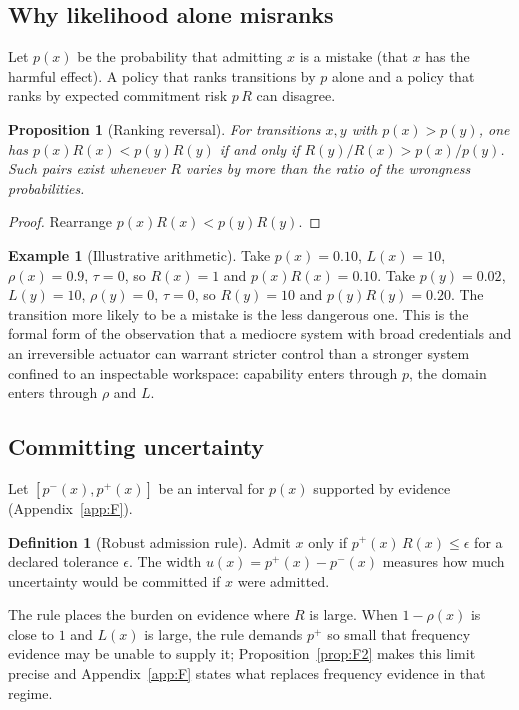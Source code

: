 \documentclass[11pt]{article}
\newtheorem{proposition}[theorem]{Proposition}
\theoremstyle{definition}
\newtheorem{definition}[theorem]{Definition}
\newtheorem{example}[theorem]{Example}
\begin{document}
\subsection{Why likelihood alone misranks}

Let $p(x)$ be the probability that admitting $x$ is a mistake (that $x$ has the harmful effect). A policy that ranks transitions by $p$ alone and a policy that ranks by expected commitment risk $p\,R$ can disagree.

\begin{proposition}[Ranking reversal]\label{prop:D3}
For transitions $x,y$ with $p(x)>p(y)$, one has $p(x)R(x)<p(y)R(y)$ if and only if $R(y)/R(x)>p(x)/p(y)$. Such pairs exist whenever $R$ varies by more than the ratio of the wrongness probabilities.
\end{proposition}
\begin{proof}
Rearrange $p(x)R(x)<p(y)R(y)$.
\end{proof}

\begin{example}[Illustrative arithmetic]
Take $p(x)=0.10$, $L(x)=10$, $\rho(x)=0.9$, $\tau=0$, so $R(x)=1$ and $p(x)R(x)=0.10$. Take $p(y)=0.02$, $L(y)=10$, $\rho(y)=0$, $\tau=0$, so $R(y)=10$ and $p(y)R(y)=0.20$. The transition more likely to be a mistake is the less dangerous one. This is the formal form of the observation that a mediocre system with broad credentials and an irreversible actuator can warrant stricter control than a stronger system confined to an inspectable workspace: capability enters through $p$, the domain enters through $\rho$ and $L$.
\end{example}

\subsection{Committing uncertainty}

Let $[p^-(x),p^+(x)]$ be an interval for $p(x)$ supported by evidence (Appendix~\ref{app:F}).

\begin{definition}[Robust admission rule]
Admit $x$ only if $p^+(x)\,R(x)\le\epsilon$ for a declared tolerance $\epsilon$. The width $u(x)=p^+(x)-p^-(x)$ measures how much uncertainty would be committed if $x$ were admitted.
\end{definition}

The rule places the burden on evidence where $R$ is large. When $1-\rho(x)$ is close to $1$ and $L(x)$ is large, the rule demands $p^+$ so small that frequency evidence may be unable to supply it; Proposition~\ref{prop:F2} makes this limit precise and Appendix~\ref{app:F} states what replaces frequency evidence in that regime.
\end{document}
